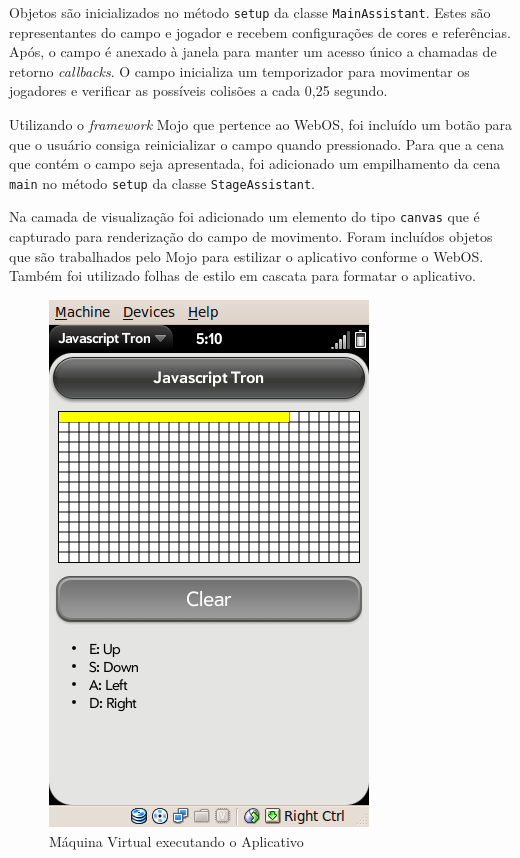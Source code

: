 \documentclass{article}
\begin{document}
Objetos são inicializados no método \texttt{setup} da classe
\texttt{MainAssistant}. Estes são representantes do campo e jogador e recebem
configurações de cores e referências. Após, o campo é anexado à janela para
manter um acesso único a chamadas de retorno \emph{callbacks}. O campo
inicializa um temporizador para movimentar os jogadores e verificar as possíveis
colisões a cada 0,25 segundo.

Utilizando o \emph{framework} Mojo que pertence ao WebOS, foi incluído um botão
para que o usuário consiga reinicializar o campo quando pressionado. Para que a
cena que contém o campo seja apresentada, foi adicionado um empilhamento da cena
\texttt{main} no método \texttt{setup} da classe \texttt{StageAssistant}.

Na camada de visualização foi adicionado um elemento do tipo \texttt{canvas} que
é capturado para renderização do campo de movimento. Foram incluídos objetos que
são trabalhados pelo Mojo para estilizar o aplicativo conforme o WebOS. Também
foi utilizado folhas de estilo em cascata para formatar o aplicativo.

\begin{figure}
    \centering{}
    \includegraphics[scale=0.5]{screenshot.png}
    \caption{Máquina Virtual executando o Aplicativo}
    \label{fig:screenshot}
\end{figure}
\end{document}
